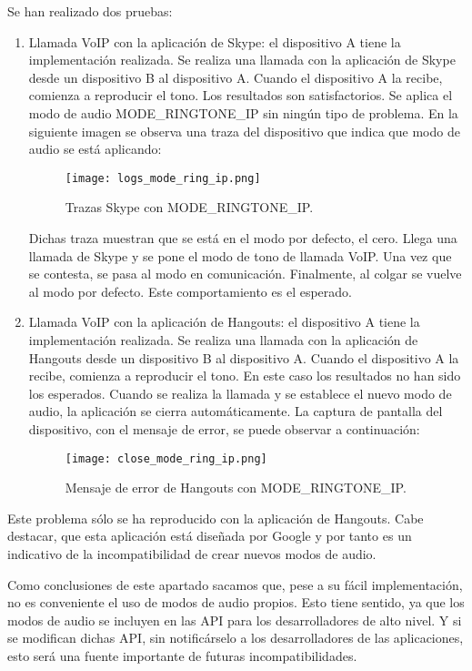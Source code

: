 Se han realizado dos pruebas:
\begin{enumerate}
	\item Llamada \gls{VoIP} con la aplicación de Skype: el dispositivo A tiene la implementación realizada. Se realiza una llamada con la aplicación de Skype desde un dispositivo B al dispositivo A. Cuando el dispositivo A la recibe, comienza a reproducir el tono. Los resultados son satisfactorios. Se aplica el modo de audio MODE\_RINGTONE\_IP sin ningún tipo de problema. En la siguiente imagen se observa una traza del dispositivo que indica que modo de audio se está aplicando:
	\begin{figure}[H]
		\centering
		\texttt{[image: logs\_mode\_ring\_ip.png]}
		\caption{Trazas Skype con MODE\_RINGTONE\_IP.}
		\label{fig:logs_mode_ring_ip}
	\end{figure}
	
	Dichas traza muestran que se está en el modo por defecto, el cero. Llega una llamada de Skype y se pone el modo de tono de llamada \gls{VoIP}. Una vez que se contesta, se pasa al modo en comunicación. Finalmente, al colgar se vuelve al modo por defecto. Este comportamiento es el esperado.
	
	\item Llamada \gls{VoIP} con la aplicación de Hangouts: el dispositivo A tiene la implementación realizada. Se realiza una llamada con la aplicación de Hangouts desde un dispositivo B al dispositivo A. Cuando el dispositivo A la recibe, comienza a reproducir el tono. En este caso los resultados no han sido los esperados. Cuando se realiza la llamada y se establece el nuevo modo de audio, la aplicación se cierra automáticamente. La captura de pantalla del dispositivo, con el mensaje de error, se puede observar a continuación:
	\begin{figure}[H]
		\centering
		\texttt{[image: close\_mode\_ring\_ip.png]}
		\caption{Mensaje de error de Hangouts con MODE\_RINGTONE\_IP.}
		\label{fig:close_mode_ring_ip}
	\end{figure}
\end{enumerate}

Este problema sólo se ha reproducido con la aplicación de Hangouts. Cabe destacar, que esta aplicación está diseñada por Google y por tanto es un indicativo de la incompatibilidad de crear nuevos modos de audio.

Como conclusiones de este apartado sacamos que, pese a su fácil implementación, no es conveniente el uso de modos de audio propios. Esto tiene sentido, ya que los modos de audio se incluyen en las \gls{API} para los desarrolladores de alto nivel. Y si se modifican dichas \gls{API}, sin notificárselo a los desarrolladores de las aplicaciones, esto será una fuente importante de futuras incompatibilidades.

